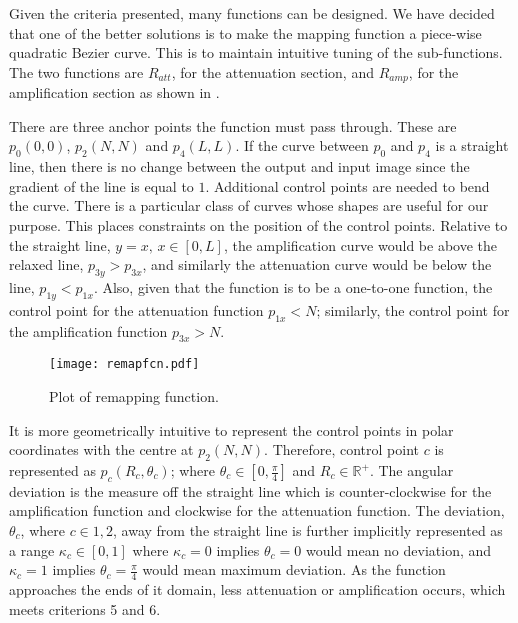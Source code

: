 \begin{definition}
	Given the criteria presented, many functions can be designed. We have decided that one of the better solutions is to make the mapping function a piece-wise quadratic Bezier curve. This is to maintain intuitive tuning of the sub-functions. The two functions are $R_{att}$, for the attenuation section, and $R_{amp}$, for the amplification section as shown in .
	
	There are three anchor points the function must pass through. These are $p_0(0,0)$, $p_2(N, N)$ and $p_4(L,L)$. If the curve between $p_0$ and $p_4$ is a straight line, then there is no change between the output and input image since the gradient of the line is equal to $1$. Additional control points are needed to bend the curve.
	There is a particular class of curves whose shapes are useful for our purpose. This places constraints on the position of the control points. Relative to the straight line, $y=x, \, x \in [0,L]$, the amplification curve would be above the relaxed line, $p_{3y} > p_{3x}$, and similarly the attenuation curve would be below the line, $p_{1y} < p_{1x}$. Also, given that the function is to be a one-to-one function, the control point for the attenuation function $p_{1x}<N$; similarly, the control point for the amplification function $p_{3x}>N$.
	
	\begin{figure}[!h]
		\centering
		\texttt{[image: remapfcn.pdf]}
		\caption{Plot of remapping function.}
		\label{fig:remapfcn}
	\end{figure}
	
	It is more geometrically intuitive to represent the control points in polar coordinates with the centre at $p_2(N,N)$. Therefore, control point $c$ is represented as $p_c(R_c, \theta_c)$; where $\theta_c \in [0, \frac{\pi}{4}]$ and $R_c \in \mathbb{R}^+$. The angular deviation is the measure off the straight line which is counter-clockwise for the amplification function and clockwise for the attenuation function. The deviation, $\theta_c$, where $c \in {1,2}$, away from the straight line is further implicitly represented as a range $\kappa_c \in [0,1]$ where $\kappa_c=0$ implies $\theta_c = 0$ would mean no deviation, and $\kappa_c = 1$ implies $\theta_c = \frac{\pi}{4}$ would mean maximum deviation.
	As the function approaches the ends of it domain, less attenuation or amplification occurs, which meets criterions 5 and 6.
	
	\begin{figure}[!t]
		\centering
\end{figure}
\end{definition}
